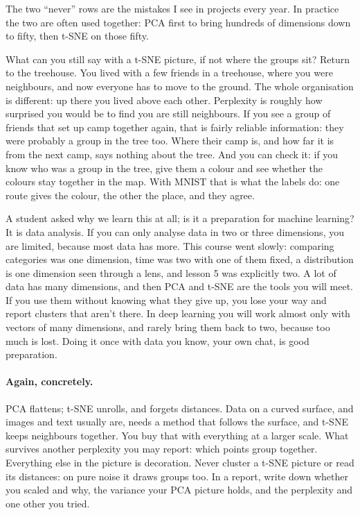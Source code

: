 \documentclass[12pt, a4paper]{article}
\theoremstyle{definition}
\theoremstyle{remark}
\newcommand{\againconcretely}{\paragraph{Again, concretely.}}
\begin{document}
The two ``never'' rows are the mistakes I see in projects every year. In practice the two are often used together: PCA first to bring hundreds of dimensions down to fifty, then t-SNE on those fifty.

What can you still say with a t-SNE picture, if not where the groups sit? Return to the treehouse. You lived with a few friends in a treehouse, where you were neighbours, and now everyone has to move to the ground. The whole organisation is different: up there you lived above each other. Perplexity is roughly how surprised you would be to find you are still neighbours. If you see a group of friends that set up camp together again, that is fairly reliable information: they were probably a group in the tree too. Where their camp is, and how far it is from the next camp, says nothing about the tree. And you can check it: if you know who was a group in the tree, give them a colour and see whether the colours stay together in the map. With MNIST that is what the labels do: one route gives the colour, the other the place, and they agree.

A student asked why we learn this at all; is it a preparation for machine learning? It is data analysis. If you can only analyse data in two or three dimensions, you are limited, because most data has more. This course went slowly: comparing categories was one dimension, time was two with one of them fixed, a distribution is one dimension seen through a lens, and lesson 5 was explicitly two. A lot of data has many dimensions, and then PCA and t-SNE are the tools you will meet. If you use them without knowing what they give up, you lose your way and report clusters that aren't there. In deep learning you will work almost only with vectors of many dimensions, and rarely bring them back to two, because too much is lost. Doing it once with data you know, your own chat, is good preparation.

\againconcretely
PCA flattens; t-SNE unrolls, and forgets distances. Data on a curved surface, and images and text usually are, needs a method that follows the surface, and t-SNE keeps neighbours together. You buy that with everything at a larger scale. What survives another perplexity you may report: which points group together. Everything else in the picture is decoration. Never cluster a t-SNE picture or read its distances: on pure noise it draws groups too. In a report, write down whether you scaled and why, the variance your PCA picture holds, and the perplexity and one other you tried.
\end{document}
